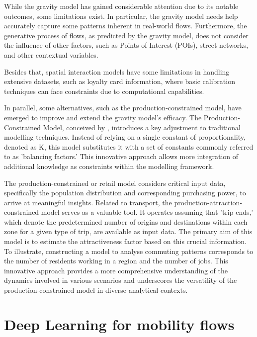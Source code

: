     While the gravity model has gained considerable attention due to its notable outcomes, some limitations exist. In particular, the gravity model needs help accurately capture some patterns inherent in real-world flows\citep{wilkinsonSpatialInteractionModels2023}. Furthermore, the generative process of flows, as predicted by the gravity model, does not consider the influence of other factors, such as Points of Interest (POIs), street networks, and other contextual variables\citep{lucaSurveyDeepLearning2021}.

    Besides that, spatial interaction models have some limitations in handling extensive datasets, such as loyalty card information, where basic calibration techniques can face constraints due to computational capabilities. \citep{wilkinsonSpatialInteractionModels2023}
    
    In parallel, some alternatives, such as the production-constrained model, have emerged to improve and extend the gravity model's efficacy. The Production-Constrained Model, conceived by \cite{wilsonFamilySpatialInteraction1971b}, introduces a key adjustment to traditional modelling techniques. Instead of relying on a single constant of proportionality, denoted as K, this model substitutes it with a set of constants commonly referred to as 'balancing factors.' This innovative approach allows more integration of additional knowledge as constraints within the modelling framework.

    The production-constrained or retail model considers critical input data, specifically the population distribution and corresponding purchasing power, to arrive at meaningful insights\citep{wilsonFamilySpatialInteraction1971b}. Related to transport, the production-attraction-constrained model serves as a valuable tool. It operates assuming that 'trip ends,' which denote the predetermined number of origins and destinations within each zone for a given type of trip, are available as input data. The primary aim of this model is to estimate the attractiveness factor based on this crucial information. To illustrate, constructing a model to analyse commuting patterns corresponds to the number of residents working in a region and the number of jobs\citep{wilsonFamilySpatialInteraction1971b}. This innovative approach provides a more comprehensive understanding of the dynamics involved in various scenarios and underscores the versatility of the production-constrained model in diverse analytical contexts.



    \section{Deep Learning for mobility flows}

